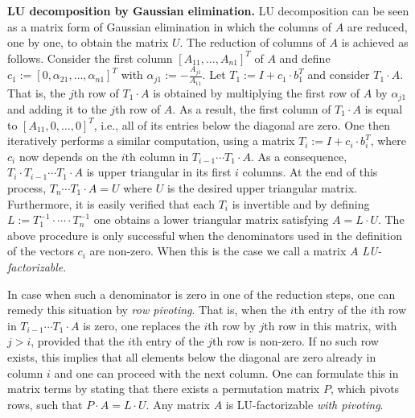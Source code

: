 \documentclass[sigconf]{acmart}
\begin{document}
\smallskip
\noindent
\textbf{LU decomposition by Gaussian elimination.} LU decomposition can be seen as a matrix form of Gaussian elimination in which the columns of $A$
are reduced, one by one, to obtain the matrix $U$. The reduction of columns of $A$ is achieved
as follows. Consider the first column $[A_{11},\ldots,A_{n1}]^T$ of $A$ and  define 
$c_1 := [0, \alpha_{21},\ldots, \alpha_{n1}]^T$ 
with $\alpha_{j1} := -\frac{A_{j1}}{A_{11}}$. Let $T_1:=I+ c_1\cdot b_1^T$ and consider
$T_1\cdot A$. That is, the $j$th row of $T_1\cdot A$ is obtained by multiplying the first row of $A$ by $\alpha_{j1}$ and adding it to the $j$th row of $A$. As a result, the first column of $T_1\cdot A$ is equal to $[A_{11},0,\ldots,0]^T$, i.e., 
all of its entries below the diagonal are zero.  One then iteratively performs a similar computation, using a matrix $T_i:=I+c_i\cdot b_i^T$, where $c_i$ now depends on the $i$th column in $T_{i-1}\cdots T_1\cdot A$. As a consequence, $T_i\cdot T_{i-1}\cdots T_1\cdot A$ is upper triangular
in its first $i$ columns. At the end of this process, $T_n\cdots T_1\cdot A=U$ where $U$ is the desired upper triangular matrix.
Furthermore, it is easily verified that each $T_i$ is invertible and by defining $L:=T_1^{-1}\cdot\cdots\cdot T_n^{-1}$ one obtains a lower triangular matrix satisfying $A=L\cdot U$. The above procedure is only successful when the denominators used in the definition of the vectors $c_i$ are non-zero. When this is the case we call a matrix $A$ \textit{LU-factorizable}. 

In case when such a denominator is zero in one of the reduction steps, one can remedy this situation by \textit{row pivoting}. That is, when the $i$th entry of the
$i$th row in $T_{i-1}\cdots T_1\cdot A$ is zero, one replaces the $i$th row by  $j$th row in this matrix, with $j>i$, provided that the $i$th entry of the $j$th row is non-zero. If no such row exists, this implies that all elements below the diagonal are zero already in column $i$ and one can proceed with the next column. One can formulate this in matrix terms by stating that there exists a permutation matrix $P$, which pivots rows, such that $P\cdot A=L\cdot U$. Any matrix $A$ is LU-factorizable \textit{with pivoting}.
\end{document}
